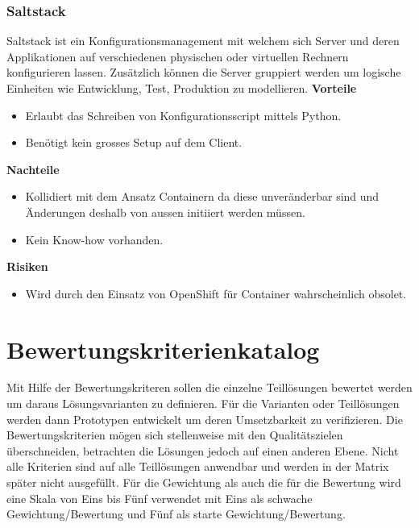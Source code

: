 \subsubsection{Saltstack}

Saltstack ist ein Konfigurationsmanagement mit welchem sich Server und deren Applikationen auf verschiedenen physischen oder virtuellen Rechnern konfigurieren lassen. Zusätzlich können die Server gruppiert werden um logische Einheiten wie Entwicklung, Test, Produktion zu modellieren.\newline
\newline
\textbf{Vorteile}
\begin{itemize}
	\item Erlaubt das Schreiben von Konfigurationsscript mittels Python.
	\item Benötigt kein grosses Setup auf dem Client.
\end{itemize}
\textbf{Nachteile}
\begin{itemize}
	\item Kollidiert mit dem Ansatz Containern da diese unveränderbar sind und Änderungen deshalb von aussen initiiert werden müssen.
	\item Kein Know-how vorhanden.
\end{itemize}
\textbf{Risiken}
\begin{itemize}
	\item Wird durch den Einsatz von OpenShift für Container wahrscheinlich obsolet.
\end{itemize}

\section{Bewertungskriterienkatalog}

Mit Hilfe der Bewertungskriteren sollen die einzelne Teillösungen bewertet werden um daraus Lösungsvarianten zu definieren. Für die Varianten oder Teillösungen werden dann Prototypen entwickelt um deren Umsetzbarkeit zu verifizieren. Die Bewertungskriterien mögen sich stellenweise mit den Qualitätszielen überschneiden, betrachten die Lösungen jedoch auf einen anderen Ebene. Nicht alle Kriterien sind auf alle Teillösungen anwendbar und werden in der Matrix später nicht ausgefüllt.\newline
Für die Gewichtung als auch die für die Bewertung wird eine Skala von Eins bis Fünf verwendet mit Eins als schwache Gewichtung/Bewertung und Fünf als starte Gewichtung/Bewertung.

